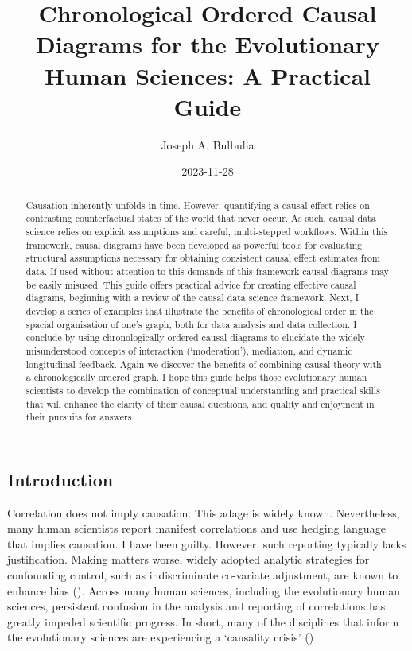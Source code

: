 \documentclass[
  singlecolumn,
  9pt]{article}
\title{Chronological Ordered Causal Diagrams for the Evolutionary Human
Sciences: A Practical Guide}
\author{Joseph A. Bulbulia}
\affil{%
                  Victoria University of Wellington, New Zealand, School
                  of Psychology, Centre for Applied Cross-Cultural
                  Research
              }
\date{2023-11-28}
\begin{document}
\maketitle
\begin{abstract}
Causation inherently unfolds in time. However, quantifying a causal
effect relies on contrasting counterfactual states of the world that
never occur. As such, causal data science relies on explicit assumptions
and careful, multi-stepped workflows. Within this framework, causal
diagrams have been developed as powerful tools for evaluating structural
assumptions necessary for obtaining consistent causal effect estimates
from data. If used without attention to this demands of this framework
causal diagrams may be easily misused. This guide offers practical
advice for creating effective causal diagrams, beginning with a review
of the causal data science framework. Next, I develop a series of
examples that illustrate the benefits of chronological order in the
spacial organisation of one's graph, both for data analysis and data
collection. I conclude by using chronologically ordered causal diagrams
to elucidate the widely misunderstood concepts of interaction
(`moderation'), mediation, and dynamic longitudinal feedback. Again we
discover the benefits of combining causal theory with a chronologically
ordered graph. I hope this guide helps those evolutionary human
scientists to develop the combination of conceptual understanding and
practical skills that will enhance the clarity of their causal
questions, and quality and enjoyment in their pursuits for answers.
\end{abstract}
\subsection{Introduction}\label{introduction}

Correlation does not imply causation. This adage is widely known.
Nevertheless, many human scientists report manifest correlations and use
hedging language that implies causation. I have been guilty. However,
such reporting typically lacks justification. Making matters worse,
widely adopted analytic strategies for confounding control, such as
indiscriminate co-variate adjustment, are known to enhance bias
(). Across many human
sciences, including the evolutionary human sciences, persistent
confusion in the analysis and reporting of correlations has greatly
impeded scientific progress. In short, many of the disciplines that
inform the evolutionary sciences are experiencing a `causality crisis'
()
\end{document}
